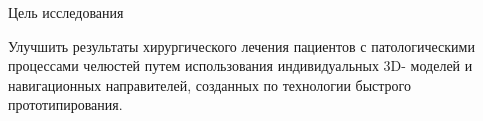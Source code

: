 
Цель исследования

Улучшить результаты хирургического лечения пациентов с 
патологическими процессами челюстей путем использования индивидуальных 3D-
моделей и навигационных направителей, созданных по технологии быстрого
прототипирования.	 
